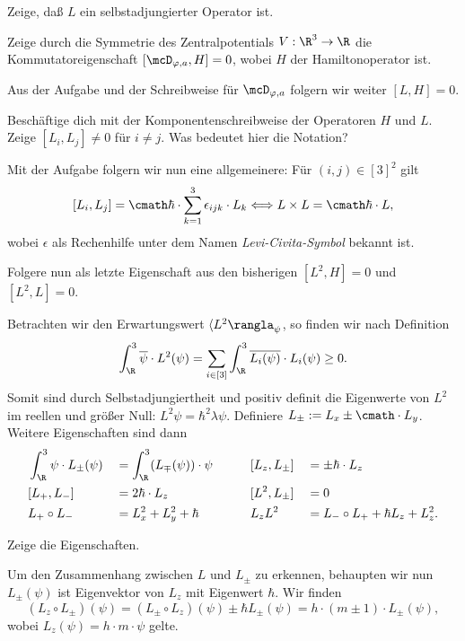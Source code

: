 \documentclass{subfiles}
\begin{document}
        \begin{Aufgabe}
            \nr{} Zeige, daß $L$ ein selbstadjungierter Operator ist. 

            \nr{} Zeige durch die Symmetrie des Zentralpotentials $V:\R^3\to\R$ die Kommutatoreigenschaft $[\mcD_{\varphi,a},H] = 0$, wobei $H$ der Hamiltonoperator ist. 
        \end{Aufgabe}
        Aus der Aufgabe und der Schreibweise für $\mcD_{\varphi,a}$ folgern wir weiter $[L,H] = 0$.

        \begin{Aufgabe}
            \nr{} Beschäftige dich mit der Komponentenschreibweise der Operatoren $H$ und $L$. Zeige $[L_i,L_j]\neq 0$ für $i\neq j$. Was bedeutet hier die Notation?
        \end{Aufgabe}
        Mit der Aufgabe folgern wir nun eine allgemeinere: Für $(i,j)\in[3]^2$ gilt 
        \[[L_i,L_j] = \cmath\hbar\cdot \sum_{k=1}^3\epsilon_{ijk}\cdot L_k \Longleftrightarrow L\times L = \cmath\hbar\cdot L,\]
        wobei $\epsilon$ als Rechenhilfe unter dem Namen \textit{Levi-Civita-Symbol} bekannt ist. 

        \begin{Aufgabe}
            \nr{} Folgere nun als letzte Eigenschaft aus den bisherigen $[L^2,H] = 0$ und $[L^2,L] = 0$.
        \end{Aufgabe}
        Betrachten wir den Erwartungswert $\langle L^2\rangla_\psi$, so finden wir nach Definition 
        \[\int_\R^3\overline\psi\cdot L^2(\psi) = \sum_{i\in[3]}\int_\R^3\overline{L_i(\psi)}\cdot L_i(\psi)\geq 0.\]
        Somit sind durch Selbstadjungiertheit und positiv definit die Eigenwerte von $L^2$ im reellen und größer Null: $L^2\psi = \hbar^2\lambda\psi$. Definiere $L_\pm:=L_x\pm\cmath\cdot L_y$. Weitere Eigenschaften sind dann
        \begin{alignat*}{4}
            &\int_\R^3\psi\cdot L_\pm(\psi) &&= \int_\R^3 (L_\mp(\psi))\cdot\psi &&\qquad [L_z,L_\pm] &&= \pm\hbar\cdot L_z\\
            &[L_+,L_-] &&= 2\hbar\cdot L_z &&\qquad [L^2,L_\pm] &&= 0\\
            &L_+\circ L_- &&= L_x^2 + L_y^2 + \hbar &&\qquad L_z L^2 &&= L_-\circ L_+ + \hbar L_z + L_z^2.
        \end{alignat*}
        
        \begin{Aufgabe}
            \nr{} Zeige die Eigenschaften.
        \end{Aufgabe}
        Um den Zusammenhang zwischen $L$ und $L_\pm$ zu erkennen, behaupten wir nun $L_\pm(\psi)$ ist Eigenvektor von $L_z$ mit Eigenwert $\hbar$. Wir finden
        \[(L_z\circ L_\pm)(\psi) = (L_\pm\circ L_z)(\psi) \pm\hbar L_\pm(\psi) = h\cdot (m\pm 1)\cdot L_\pm(\psi),\]
        wobei $L_z(\psi) = h\cdot m\cdot \psi$ gelte. 
\end{document}
